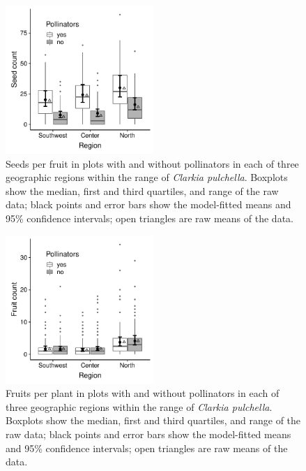 \documentclass{article}
\begin{document}
\begin{figure}[p]
\centering
\includegraphics[width = 0.5\textwidth]{figs/seeds_region}
\caption[Seed set in plots with and without pollinators by region]{Seeds per fruit in plots with and without pollinators in each of three geographic regions within the range of \textit{Clarkia pulchella}. Boxplots show the median, first and third quartiles, and range of the raw data; black points and error bars show the model-fitted means and 95\% confidence intervals; open triangles are raw means of the data.}
\label{seedsregion}
\end{figure}


\clearpage


\begin{figure}[p]
\centering
\includegraphics[width = 0.5\textwidth]{figs/fruits_region}
\caption[Fruits per plant in plots with and without pollinators by region]{Fruits per plant in plots with and without pollinators in each of three geographic regions within the range of \textit{Clarkia pulchella}. Boxplots show the median, first and third quartiles, and range of the raw data; black points and error bars show the model-fitted means and 95\% confidence intervals; open triangles are raw means of the data.}
\label{fruitsregion}
\end{figure}
\end{document}
